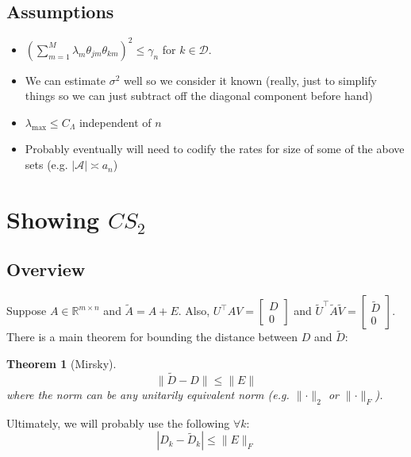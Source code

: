 \documentclass[11pt]{article}
\newtheorem{theorem}{Theorem}[section]
\newcommand{\R}{\mathbb{R}}
\newcommand{\norm}[1]{\lVert #1 \rVert}
\newcommand{\A}{\mathcal{A}}
\newcommand{\D}{\mathcal{D}}
\begin{document}
\subsection{Assumptions}
\label{sec:assumptions}

\begin{itemize}
\item $(\sum_{m = 1}^M \lambda_m \theta_{jm} \theta_{km})^2 \leq \gamma_n$ for $k \in \D$.
\item We can estimate $\sigma^2$ well so we consider it known (really, just to simplify things so we can just subtract off the diagonal component before hand)
\item $\lambda_{\max} \leq C_{\Lambda}$ independent of $n$
\item Probably eventually will need to codify the rates for size of some of the above sets (e.g. $|\A| \asymp a_n$)
\end{itemize}

\newpage

\section{Showing $CS_2$}
\subsection{Overview}
Suppose $A \in \R^{m\times n}$ and $\tilde{A} = A + E$.  Also, $U^{\top}AV = \begin{bmatrix} D \\ 0 \end{bmatrix}$ and $\tilde{U}^{\top}\tilde{A}\tilde{V} = \begin{bmatrix} \tilde{D} \\ 0 \end{bmatrix}$.
There is a main theorem for bounding the distance between $D$ and $\tilde{D}$:

\begin{theorem}[Mirsky]
\begin{equation}
\norm{\tilde{D} - D} \leq \norm{E}
\end{equation}
where the norm can be any unitarily equivalent norm (e.g. $\norm{\cdot}_2$ or $\norm{\cdot}_F$).
\label{thm:mirsky}
\end{theorem}

Ultimately, we will probably use the following $\forall k$:
\begin{equation}
|D_k - \tilde{D}_k | \leq \norm{E}_F
\end{equation}
\end{document}
